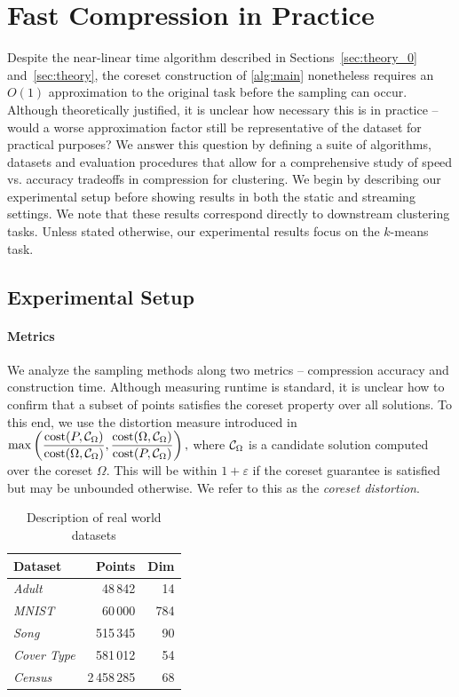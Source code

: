 \section{Fast Compression in Practice}
\label{sec:results}

Despite the near-linear time algorithm described in Sections~\ref{sec:theory_0} and~\ref{sec:theory}, the coreset construction of \cref{alg:main} nonetheless
requires an $O(1)$ approximation to the original task before the sampling can occur. Although theoretically justified, it is unclear how necessary this is in
practice -- would a worse approximation factor still be representative of the dataset for practical purposes? We answer this question by defining a suite of
algorithms, datasets and evaluation procedures that allow for a comprehensive study of speed vs. accuracy tradeoffs in compression for clustering.  We begin by
describing our experimental setup before showing results in both the static and streaming settings. We note that these results correspond directly to
downstream clustering tasks. Unless stated otherwise, our experimental results focus on the $k$-means task.

\subsection{Experimental Setup}
\paragraph*{Metrics}
\label{sssec:metrics}

We analyze the sampling methods along two metrics -- compression accuracy and construction time. Although measuring runtime is standard, it is unclear how to
confirm that a subset of points satisfies the coreset property over all solutions. To this end, we use the distortion measure introduced in~\cite{chrisESA} $
\max \left( \dfrac{\operatorname{cost}(P, \mathcal C_{\Omega})}{\operatorname{cost}(\Omega, \mathcal C_{\Omega})}, \dfrac{\operatorname{cost}(\Omega, \mathcal C_{\Omega})}{\operatorname{cost}(P, \mathcal C_{\Omega})} \right),$ where
$\mathcal C_{\Omega}$ is a candidate solution computed over the coreset $\Omega$. This will be within $1+\varepsilon$ if the coreset guarantee is satisfied
but may be unbounded otherwise.  We refer to this as the \emph{coreset distortion}.

\begin{table}
    \centering
    \begin{tabular}{lrr}
        Dataset & Points & Dim \\
        \hline
        \emph{Adult} & 48\,842 & 14 \\
        \emph{MNIST} & 60\,000 & 784 \\
        \emph{Song} & 515\,345 & 90 \\
        \emph{Cover Type} & 581\,012 & 54 \\
        \emph{Census} & 2\,458\,285 & 68 \\
        \hline
    \end{tabular}
    \caption{Description of real world datasets}
    \label{tbl:datasets}
\end{table}


